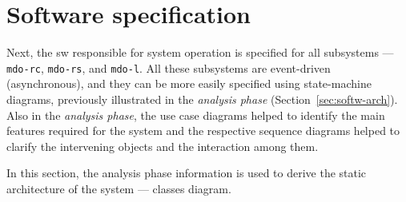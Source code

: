 %
\section{Software specification}
\label{sec:sw-specs}
Next, the \gls{sw} responsible for system operation is specified for all
subsystems --- \texttt{\gls{mdo-rc}}, \texttt{\gls{mdo-rs}}, and
\texttt{mdo-l}.
All these subsystems are event-driven (asynchronous), and they can be more easily
specified using state-machine diagrams, previously illustrated in the
\emph{analysis phase} (Section~\ref{sec:softw-arch}). Also in the \emph{analysis
phase}, the use case diagrams helped to identify the main features required for
the system and the respective sequence diagrams helped to clarify the
intervening objects and the interaction among them.

In this section, the analysis phase information is used to derive the static
architecture of the system --- classes diagram.

% 
% 
% 
% 
